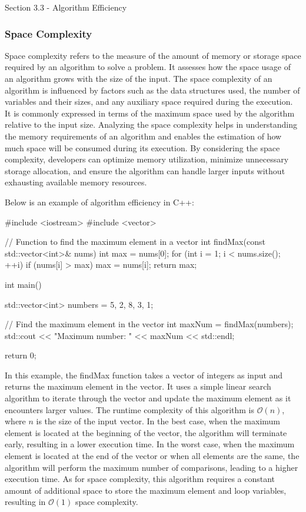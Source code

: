 \begin{notes}{Section 3.3 - Algorithm Efficiency}
    \subsubsection*{Space Complexity}
    
    Space complexity refers to the measure of the amount of memory or storage space required by an algorithm to solve a problem. It assesses how the space usage of an algorithm grows with the size of the input. The space complexity of an algorithm is influenced by factors such as the data structures used, the number of variables and their sizes, and any auxiliary space required during the execution. It is commonly expressed in terms 
    of the maximum space used by the algorithm relative to the input size. Analyzing the space complexity helps in understanding the memory requirements of an algorithm and enables the estimation of how much space will be consumed during its execution. By considering the space complexity, developers can optimize memory utilization, minimize unnecessary storage allocation, and ensure the algorithm can handle larger inputs without 
    exhausting available memory resources.
    
    \begin{highlight}
        Below is an example of algorithm efficiency in C++:
    \begin{code}[C++]
    #include <iostream>
    #include <vector>
    
    // Function to find the maximum element in a vector
    int findMax(const std::vector<int>& nums) {
        int max = nums[0];
        for (int i = 1; i < nums.size(); ++i) {
            if (nums[i] > max) {
                max = nums[i];
            }
        }
        return max;
    }
    
    int main() {
        std::vector<int> numbers = {5, 2, 8, 3, 1};
    
        // Find the maximum element in the vector
        int maxNum = findMax(numbers);
        std::cout << "Maximum number: " << maxNum << std::endl;
    
        return 0;
    }        
    \end{code}
        In this example, the findMax function takes a vector of integers as input and returns the maximum element in the vector. It uses a simple linear search algorithm to iterate through the vector and update the maximum element as it encounters larger values. The runtime complexity of this algorithm is $\mathcal{O}(n)$, where $n$ is the size of the input vector. In the best case, when the maximum element is located at the beginning 
        of the vector, the algorithm will terminate early, resulting in a lower execution time. In the worst case, when the maximum element is located at the end of the vector or when all elements are the same, the algorithm will perform the maximum number of comparisons, leading to a higher execution time. As for space complexity, this algorithm requires a constant amount of additional space to store the maximum element and loop variables, 
        resulting in $\mathcal{O}(1)$ space complexity.
    

\end{highlight}
\end{notes}
